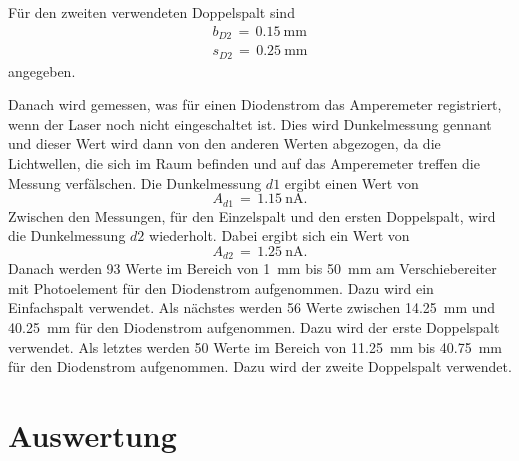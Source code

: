 \documentclass[
  bibliography=totoc,     %
  captions=tableheading,  %
  titlepage=firstiscover, %
]{scrartcl}
\begin{document}
\noindent
Für den zweiten verwendeten Doppelspalt sind
\begin{align*}
  b_{D2}\,=\,\SI{0.15}{\milli\metre}\\
  s_{D2}\,=\,\SI{0.25}{\milli\metre}
  \label{eqn:doppelspalt2}
\end{align*}
angegeben.

\noindent
Danach wird gemessen, was für einen Diodenstrom das Amperemeter registriert, wenn der Laser noch nicht eingeschaltet ist. Dies wird Dunkelmessung gennant und dieser Wert wird dann von den anderen Werten abgezogen, da die Lichtwellen, die sich im Raum befinden und auf das Amperemeter treffen die Messung verfälschen.
Die Dunkelmessung $d1$ ergibt einen Wert von
\begin{equation*}
  A_{d1}\,=\,\SI{1.15}{\nano\ampere}.
  \label{eqn:dunkel}
\end{equation*}
Zwischen den Messungen, für den Einzelspalt und den ersten Doppelspalt, wird die Dunkelmessung $d2$ wiederholt.
Dabei ergibt sich ein Wert von
\begin{equation*}
  A_{d2}\,=\,\SI{1.25}{\nano\ampere}.
  \label{eqn:dunkel2}
\end{equation*}
Danach werden 93 Werte im Bereich von \SI{1}{\milli\metre} bis \SI{50}{\milli\metre} am Verschiebereiter mit Photoelement für den Diodenstrom aufgenommen. Dazu wird ein Einfachspalt verwendet.
Als nächstes werden 56 Werte zwischen \SI{14.25}{\milli\metre} und \SI{40.25}{\milli\metre} für den Diodenstrom aufgenommen. Dazu wird der erste Doppelspalt verwendet.
Als letztes werden 50 Werte im Bereich von \SI{11.25}{\milli\metre} bis \SI{40.75}{\milli\metre} für den Diodenstrom aufgenommen. Dazu wird der zweite Doppelspalt verwendet.
\clearpage
\section{Auswertung}
\label{sec:auswertung}
\end{document}
